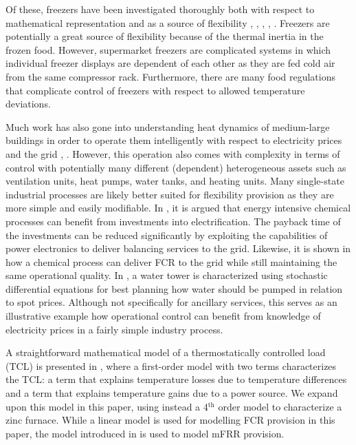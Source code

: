 \documentclass[sigconf]{acmart}
\begin{document}
Of these, freezers have been investigated thoroughly both with respect to mathematical representation \cite{pedersen2016improving}  and as a source of flexibility \cite{sossan2016grey}, \cite{o2013modelling}, \cite{de2019leveraging}, \cite{misaghian2022fast}, \cite{vrettos2016fast}. Freezers are potentially a great source of flexibility because of the thermal inertia in the frozen food. However, supermarket freezers are complicated systems in which individual freezer displays are dependent of each other as they are fed cold air from the same compressor rack. Furthermore, there are many food regulations that complicate control of freezers with respect to allowed temperature deviations.

Much work has also gone into understanding heat dynamics of medium-large buildings \cite{thilker2021non} in order to operate them intelligently with respect to electricity prices and the grid \cite{contreras2018tractable}, \cite{finck2018quantifying}. However, this operation also comes with complexity in terms of control with potentially many different (dependent) heterogeneous assets such as ventilation units, heat pumps, water tanks, and heating units. Many single-state industrial processes are likely better suited for flexibility provision as they are more simple and easily modifiable.
%
In \cite{mallapragada2023decarbonization}, it is argued that energy intensive chemical processes can benefit from investments into electrification. The payback time of the investments can be reduced significantly by exploiting the capabilities of power electronics to deliver balancing services to the grid. Likewise, it is shown in \cite{samani2022flexible} how a chemical process can deliver FCR to the grid while still maintaining the same operational quality.
%
In \cite{junker2020stochastic}, a water tower is characterized using stochastic differential equations for best planning how water should be pumped in relation to spot prices. Although not specifically for ancillary services, this serves as an illustrative example how operational control can benefit from knowledge of electricity prices in a fairly simple industry process.

A straightforward mathematical model of a thermostatically controlled load (TCL) is presented in  \cite{hao2014aggregate}, where a first-order model with two terms characterizes the TCL: a term that explains temperature losses due to temperature differences and a term that explains temperature gains due to a power source. We expand upon this model in this paper, using instead a 4$^{\text{th}}$ order model to characterize a zinc furnace. While a linear model is used for modelling FCR provision in this paper, the model introduced in \cite{gade2023load} is used to model mFRR provision.
\end{document}

